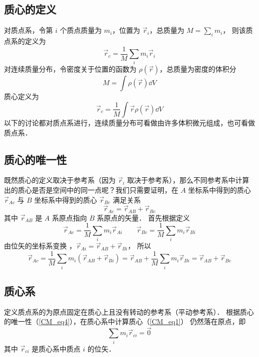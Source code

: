 

\subsection{质心的定义}

对质点系，令第 $i$ 个质点质量为 $m_i$，位置为 $\vec r_i$，总质量为 $M = \sum\limits_i m_i$， 则该质点系的定义为
\begin{equation}\label{CM_eq1}
\vec r_c = \frac{1}{M}\sum_i m_i \vec r_i
\end{equation}
对连续质量分布，令密度关于位置的函数为 $\rho (\vec r)$，总质量为密度的体积分 %
\begin{equation}
M = \int \rho (\vec r) \dd{V}
\end{equation}
质心定义为
\begin{equation}
\vec r_c = \frac{1}{M}\int \vec r\rho (\vec r) \dd{V}
\end{equation}
以下的讨论都对质点系进行，连续质量分布可看做由许多体积微元组成，也可看做质点系．

\subsection{质心的唯一性}
既然质心的定义取决于参考系（因为 $\vec r_i$ 取决于参考系），那么不同参考系中计算出的质心是否是空间中的同一点呢？我们只需要证明，在 $A$ 坐标系中得到的质心 $\vec r_{Ac}$ 与 $B$ 坐标系中得到的质心 $\vec r_{Bc}$ 满足关系
\begin{equation}\label{CM_eq4}
\vec r_{Ac} = \vec r_{AB} + \vec r_{Bc}
\end{equation}
其中 $\vec r_{AB}$ 是 $A$ 系原点指向 $B$ 系原点的矢量． 首先根据定义
\begin{equation}
\vec r_{Ac} = \frac{1}{M}\sum_i m_i \vec r_{Ai}  \qquad \vec r_{Bc} = \frac{1}{M}\sum_i  m_i \vec r_{Bi} 
\end{equation}
由位矢的坐标系变换%
，$\vec r_{Ai} = \vec r_{AB} + \vec r_{Bi}$， 所以
\begin{equation}
\vec r_{Ac} = \frac{1}{M}\sum_i m_i(\vec r_{AB} + \vec r_{Bi})  = \vec r_{AB} + \frac{1}{M} \sum_i m_i \vec r_{Bi}  = \vec r_{AB} + \vec r_{Bc}
\end{equation}
 
\subsection{质心系}
定义质点系的为原点固定在质心上且没有转动的参考系（平动参考系）．%
根据质心的唯一性（\autoref{CM_eq4}），在质心系中计算质心（\autoref{CM_eq1}） 仍然落在原点，即
\begin{equation}\label{CM_eq7}
\sum_i m_i \vec r_{ci} = \vec 0
\end{equation}
其中 $\vec r_{ci}$ 是质心系中质点 $i$ 的位矢．

